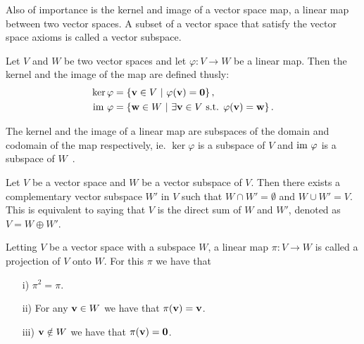 
	Also of importance is the kernel and image of a vector space map, a linear map between two vector spaces. A subset of a vector space that satisfy the vector space axioms is called a vector subspace. 
		
	\begin{definition}\label{def:kernelimage}
		Let $V$ and $W$ be two vector spaces and let $\varphi: V \rightarrow W$ be a linear map. Then the kernel and the image of the map are defined thusly:
		\begin{align*}
			 \ker \varphi &= \left\lbrace \mathbf{v} \in V \ \middle\vert \ \varphi(\mathbf{v}) = \mathbf{0} \right\rbrace, \\  \text{im } \varphi &= \left\lbrace \mathbf{w} \in W \ \middle\vert \ \exists \mathbf{v} \in V \text{ s.t. } \varphi(\mathbf{v}) = \mathbf{w} \right\rbrace.
		\end{align*}
	\end{definition}
	
	\begin{remark}
		The kernel and the image of a linear map are subspaces of the domain and codomain of the map respectively, ie. $\ker \varphi$ is a subspace of $V$ and $\text{im } \varphi$ is a subspace of $W$~\cite[Sect.5.4.]{Holst}.
	\end{remark}	
	
	\begin{theorem}\label{thm:compsubspaces}\cite[Thm.12.16]{Holst}
		Let $V$ be a vector space and $W$ be a vector subspace of $V$. Then there exists a complementary vector subspace $W'$ in $V$ such that $W \cap W' = \emptyset$ and $W \cup W' = V$. This is equivalent to saying that $V$ is the direct sum of $W$ and $W'$, denoted as $V = W \oplus W'$.
	\end{theorem}
	
	Letting $V$ be a vector space with a subspace $W$, a linear map $\pi: V \rightarrow W$ is called a projection of $V$ onto $W$. For this $\pi$ we have that
	\begin{enumerate}
		\item[i)]  $\pi^2 = \pi$.
		\item[ii)] For any $\mathbf{v} \in W$ we have that $\pi(\mathbf{v}) = \mathbf{v}$.
		\item[iii)] $\mathbf{v} \notin W$ we have that $\pi(\mathbf{v}) = \mathbf{0}$.
	\end{enumerate}
	
